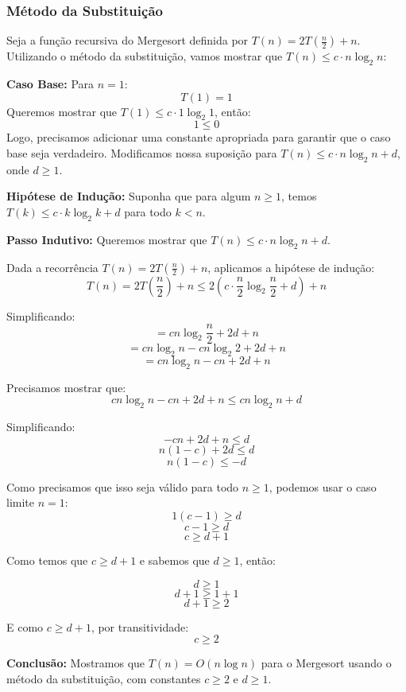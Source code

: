 \subsubsection{Método da Substituição}

Seja a função recursiva do Mergesort definida por \( T(n) = 2T(\frac{n}{2}) + n \). Utilizando o método da substituição, vamos mostrar que \( T(n) \leq c \cdot n\log_2 n \):

\textbf{Caso Base:} Para \( n = 1 \):
\[ T(1) = 1 \]
Queremos mostrar que \( T(1) \leq c \cdot 1\log_2 1 \), então:
\[ 1 \leq 0 \]
Logo, precisamos adicionar uma constante apropriada para garantir que o caso base seja verdadeiro.
Modificamos nossa suposição para \( T(n) \leq c \cdot n\log_2 n + d \), onde \( d \geq 1 \).

\textbf{Hipótese de Indução:} Suponha que para algum \( n \geq 1 \), temos \( T(k) \leq c \cdot k\log_2 k + d \) para todo \( k < n \).

\textbf{Passo Indutivo:} Queremos mostrar que \( T(n) \leq c \cdot n\log_2 n + d \).

Dada a recorrência \( T(n) = 2T(\frac{n}{2}) + n \), aplicamos a hipótese de indução:
\[ T(n) = 2T(\frac{n}{2}) + n \leq 2(c \cdot \frac{n}{2}\log_2 \frac{n}{2} + d) + n \]

Simplificando:
\[ = cn\log_2 \frac{n}{2} + 2d + n \]
\[ = cn\log_2 n - cn\log_2 2 + 2d + n \]
\[ = cn\log_2 n - cn + 2d + n \]

Precisamos mostrar que:
\[ cn\log_2 n - cn + 2d + n \leq cn\log_2 n + d \]

Simplificando:
\[ -cn + 2d + n \leq d \]
\[ n(1-c) + 2d \leq d \]
\[ n(1-c) \leq -d \]

Como precisamos que isso seja válido para todo \( n \geq 1 \), podemos usar o caso limite \( n = 1 \):
\[ 1(c-1) \geq d \]
\[ c-1 \geq d \]
\[ c \geq d+1 \]

Como temos que \( c \geq d+1 \) e sabemos que \( d \geq 1 \), então:

\[ d \geq 1 \]
\[ d + 1 \geq 1 + 1 \]
\[ d + 1 \geq 2 \]

E como \( c \geq d+1 \), por transitividade:
\[ c \geq 2 \]

\textbf{Conclusão:} Mostramos que \( T(n) = O(n\log n) \) para o Mergesort usando o método da substituição, com constantes \( c \geq 2 \) e \( d \geq 1 \).
